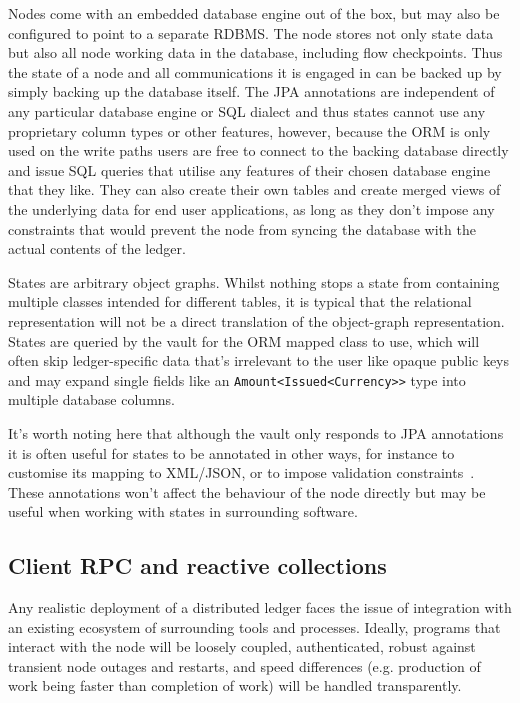 \documentclass{article}
\begin{document}
Nodes come with an embedded database engine out of the box, but may also be configured to point to a separate
RDBMS. The node stores not only state data but also all node working data in the database, including flow
checkpoints. Thus the state of a node and all communications it is engaged in can be backed up by simply backing up
the database itself. The JPA annotations are independent of any particular database engine or SQL dialect and thus
states cannot use any proprietary column types or other features, however, because the ORM is only used on the
write paths users are free to connect to the backing database directly and issue SQL queries that utilise any
features of their chosen database engine that they like. They can also create their own tables and create merged
views of the underlying data for end user applications, as long as they don't impose any constraints that would
prevent the node from syncing the database with the actual contents of the ledger.

States are arbitrary object graphs. Whilst nothing stops a state from containing multiple classes intended for
different tables, it is typical that the relational representation will not be a direct translation of the
object-graph representation. States are queried by the vault for the ORM mapped class to use, which will often skip
ledger-specific data that's irrelevant to the user like opaque public keys and may expand single fields like an
\texttt{Amount<Issued<Currency>>} type into multiple database columns.

It's worth noting here that although the vault only responds to JPA annotations it is often useful for states to be
annotated in other ways, for instance to customise its mapping to XML/JSON, or to impose validation
constraints~\cite{BeanValidation}. These annotations won't affect the behaviour of the node directly but may be
useful when working with states in surrounding software.

\subsection{Client RPC and reactive collections}\label{sec:client-rpc-and-reactive-collections}

Any realistic deployment of a distributed ledger faces the issue of integration with an existing ecosystem of
surrounding tools and processes. Ideally, programs that interact with the node will be loosely coupled,
authenticated, robust against transient node outages and restarts, and speed differences (e.g. production of work
being faster than completion of work) will be handled transparently.
\end{document}
